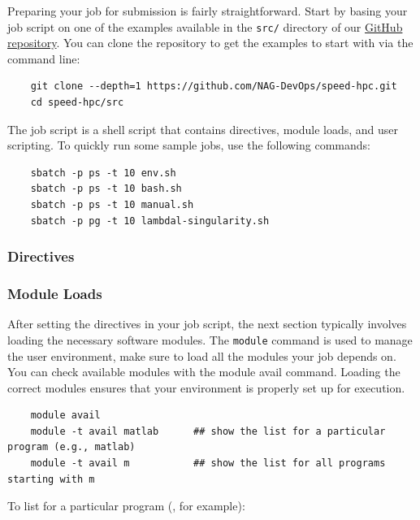 \documentclass{easychair}
\begin{document}
Preparing your job for submission is fairly straightforward.
Start by basing your job script on one of the examples available in the \texttt{src/}
directory of our \href{https://github.com/NAG-DevOps/speed-hpc}{GitHub repository}.
You can clone the repository to get the examples to start with via the command line:

\begin{verbatim}
    git clone --depth=1 https://github.com/NAG-DevOps/speed-hpc.git
    cd speed-hpc/src
\end{verbatim}

\noindent The job script is a shell script that contains directives, module loads, and user scripting.
To quickly run some sample jobs, use the following commands:
\begin{verbatim}
    sbatch -p ps -t 10 env.sh
    sbatch -p ps -t 10 bash.sh
    sbatch -p ps -t 10 manual.sh
    sbatch -p pg -t 10 lambdal-singularity.sh
\end{verbatim}

\subsubsection{Directives}
\label{sect:directives}


\subsubsection{Module Loads}
\label{sect:modules}

After setting the directives in your job script, the next section typically involves loading 
the necessary software modules. The \texttt{module} command is used to manage the user environment, 
make sure to load all the modules your job depends on. You can check available modules with the 
module avail command. Loading the correct modules ensures that your environment is properly 
set up for execution.

\begin{verbatim}
    module avail
    module -t avail matlab		## show the list for a particular program (e.g., matlab)
    module -t avail m		    ## show the list for all programs starting with m     
\end{verbatim}

\noindent To list for a particular program (, for example):
\end{document}
